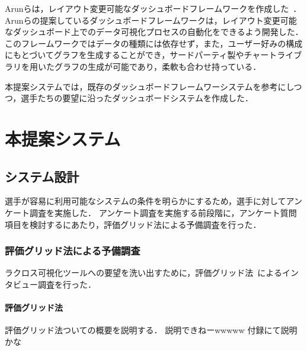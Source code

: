 \documentclass[sotsuron]{kuee}
\begin{document}
	Arunらは，レイアウト変更可能なダッシュボードフレームワークを作成した~\cite{dashboard}． 
	Arunらの提案しているダッシュボードフレームワークは，レイアウト変更可能なダッシュボード上でのデータ可視化プロセスの自動化をできるよう開発した． 
	このフレームワークではデータの種類には依存せず，また，ユーザー好みの構成にもとづいてグラフを生成することができ，サードパーティ製やチャートライブラリを用いたグラフの生成が可能であり，柔軟も合わせ持っている． 
	
	本提案システムでは，既存のダッシュボードフレームワーシステムを参考にしつつ，選手たちの要望に沿ったダッシュボードシステムを作成した． 

\chapter{本提案システム}
	\section{システム設計}
		選手が容易に利用可能なシステムの条件を明らかにするため，選手に対してアンケート調査を実施した． 
		アンケート調査を実施する前段階に，アンケート質問項目を検討するにあたり，評価グリッド法による予備調査を行った． 
		\subsection{評価グリッド法による予備調査}
			ラクロス可視化ツールへの要望を洗い出すために，評価グリッド法~\cite{EGM}によるインタビュー調査を行った． 
			\subsubsection{評価グリッド法}
				評価グリッド法ついての概要を説明する． 
				説明できねーwwwww
				付録にて説明かな
\end{document}

